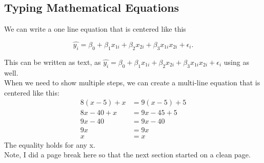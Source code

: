 \documentclass{article}\usepackage[]{graphicx}\usepackage[]{xcolor}
\begin{document}
\begin{multicols}{2}
\subsection {Typing Mathematical Equations}
We can write a one line equation that is centered like this
\begin{center}
\[\widehat{y_i} = \beta_0 + \beta_1 x_{1i}+ \beta_2 x_{2i} + \beta_3 x_{1i} x_{2i} + \epsilon_i.\]
\end{center}
This can be written as text, as $\widehat{y_i} = \beta_0 + \beta_1 x_{1i}+ \beta_2 x_{2i} + \beta_3 x_{1i} x_{2i} + \epsilon_i$ using as well.\\
\indent When we need to show multiple steps, we can create a
multi-line equation that is centered like this:
\begin{align*}
8(x - 5) + x&= 9(x - 5) + 5\\
  8x - 40 + x&= 9x - 45 + 5 \tag{Distributing}\\
    9x - 40&= 9x - 40 \tag{Combining Like Terms}\\
      9x&= 9x \tag{Adding 40 to both sides}\\
        x&= x \tag{Dividing both sides by 9}
\end{align*}
The equality holds for any x.\\
\indent Note, I did a page break here so that the next section
started on a clean page.
\pagebreak

\end{multicols}
\end{document}
